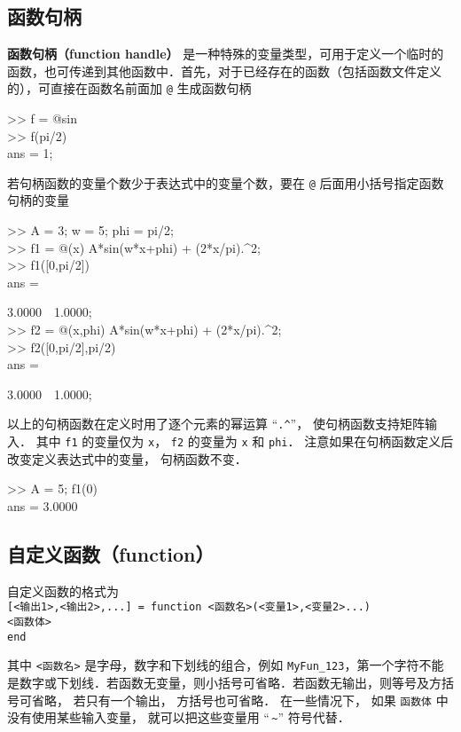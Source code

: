 \subsection{函数句柄}
\textbf{函数句柄（function handle）} 是一种特殊的变量类型，可用于定义一个临时的函数，也可传递到其他函数中．首先，对于已经存在的函数（包括函数文件定义的），可直接在函数名前面加 \texttt{@} 生成函数句柄
\begin{Command}
>> f = @sin \\
>> f(pi/2) \\
ans = 1;
\end{Command}
若句柄函数的变量个数少于表达式中的变量个数，要在 \texttt{@} 后面用小括号指定函数句柄的变量
\begin{Command}
>> A = 3; w = 5; phi = pi/2; \\
>> f1 = @(x) A*sin(w*x+phi) + (2*x/pi).\^{}2; \\
>> f1([0,pi/2]) \\
ans = \par
3.0000\ \ 1.0000; \\
>> f2 = @(x,phi) A*sin(w*x+phi) + (2*x/pi).\^{}2; \\
>> f2([0,pi/2],pi/2) \\
ans = \par
3.0000\ \ 1.0000;
\end{Command}
以上的句柄函数在定义时用了逐个元素的幂运算 “\texttt{.\^{}}”， 使句柄函数支持矩阵输入． 其中 \texttt{f1} 的变量仅为 \texttt{x}， \texttt{f2} 的变量为 \texttt{x} 和 \texttt{phi}． 注意如果在句柄函数定义后改变定义表达式中的变量， 句柄函数不变．
\begin{Command}
>> A = 5; f1(0)\\
ans = 3.0000
\end{Command}

\subsection{自定义函数（function）}
自定义函数的格式为\\
\texttt{[<输出1>,<输出2>,...] = function <函数名>(<变量1>,<变量2>...)}\\
\texttt{<函数体>}\\
\texttt{end}

其中 \texttt{<函数名>} 是字母，数字和下划线的组合，例如 \texttt{MyFun\_123}，第一个字符不能是数字或下划线．若函数无变量，则小括号可省略．若函数无输出，则等号及方括号可省略， 若只有一个输出， 方括号也可省略． 在一些情况下， 如果 \texttt{函数体} 中没有使用某些输入变量， 就可以把这些变量用 “\;\,\texttt{\~}” 符号代替．

